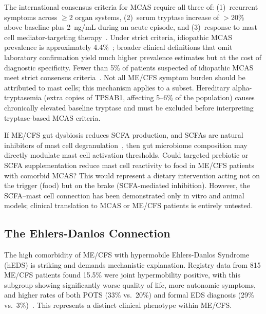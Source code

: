 \begin{warning}
\label{warn:mcas-overdiagnosis}
The international consensus criteria for MCAS require all three of: (1)~recurrent symptoms across $\geq$2 organ systems, (2)~serum tryptase increase of $>$20\% above baseline plus 2~ng/mL during an acute episode, and (3)~response to mast cell mediator-targeting therapy~\cite{Gulen2024mcascriteria,Castells2024mcasreview}. Under strict criteria, idiopathic MCAS prevalence is approximately 4.4\%~\cite{Gulen2024mcascriteria}; broader clinical definitions that omit laboratory confirmation yield much higher prevalence estimates but at the cost of diagnostic specificity. Fewer than 5\% of patients suspected of idiopathic MCAS meet strict consensus criteria~\cite{Castells2024mcasreview}. Not all ME/CFS symptom burden should be attributed to mast cells; this mechanism applies to a subset. Hereditary alpha-tryptasemia (extra copies of TPSAB1, affecting 5--6\% of the population) causes chronically elevated baseline tryptase and must be excluded before interpreting tryptase-based MCAS criteria.
\end{warning}

\begin{open_question}
\label{oq:scfa-mast-dysbiosis}
If ME/CFS gut dysbiosis reduces SCFA production, and SCFAs are natural inhibitors of mast cell degranulation~\cite{Folkerts2018fiber}, then gut microbiome composition may directly modulate mast cell activation thresholds. Could targeted prebiotic or SCFA supplementation reduce mast cell reactivity to food in ME/CFS patients with comorbid MCAS? This would represent a dietary intervention acting not on the trigger (food) but on the brake (SCFA-mediated inhibition). However, the SCFA--mast cell connection has been demonstrated only in vitro and animal models; clinical translation to MCAS or ME/CFS patients is entirely untested.
\end{open_question}

\subsection{The Ehlers-Danlos Connection}
\label{subsec:eds-connection}

The high comorbidity of ME/CFS with hypermobile Ehlers-Danlos Syndrome (hEDS) is striking and demands mechanistic explanation. Registry data from 815 ME/CFS patients found 15.5\% were joint hypermobility positive, with this subgroup showing significantly worse quality of life, more autonomic symptoms, and higher rates of both POTS (33\% vs.\ 20\%) and formal EDS diagnosis (29\% vs.\ 3\%)~\cite{Mudie2024hypermobility}. This represents a distinct clinical phenotype within ME/CFS.

